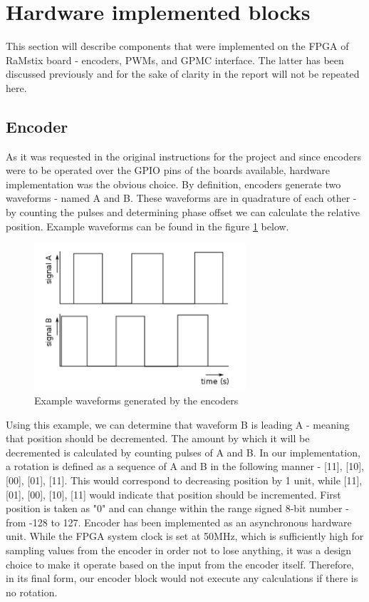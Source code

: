 \newpage
\section{Hardware implemented blocks}

This section will describe components that were implemented on the FPGA of RaMstix board - encoders, PWMs, and GPMC interface. The latter has been discussed previously and for the sake of clarity in the report will not be repeated here.

\subsection{Encoder}
As it was requested in the original instructions for the project and since encoders were to be operated over the GPIO pins of the boards available, hardware implementation was the obvious choice. By definition, encoders generate two waveforms - named A and B. These waveforms are in quadrature of each other - by counting the pulses and determining phase offset we can calculate the relative position. Example waveforms can be found in the figure \ref{encoder_waves} below.\\

\begin{figure}[!ht]
\centering
 \includegraphics[width=0.7\textwidth]{images/encoder.png}
 \caption{Example waveforms generated by the encoders}
 \label{encoder_waves}
\end{figure}

Using this example, we can determine that waveform B is leading A - meaning that position should be decremented. The amount by which it will be decremented is calculated by counting pulses of A and B. In our implementation, a rotation is defined as a sequence of A and B in the following manner - [11], [10], [00], [01], [11]. This would correspond to decreasing position by 1 unit, while [11], [01], [00], [10], [11] would indicate that position should be incremented. First position is taken as "0" and can change within the range signed 8-bit number - from -128 to 127. Encoder has been implemented as an asynchronous hardware unit. While the FPGA system clock is set at 50MHz, which is sufficiently high for sampling values from the encoder in order not to lose anything, it was a design choice to make it operate based on the input from the encoder itself. Therefore, in its final form, our encoder block would not execute any calculations if there is no rotation.\\

